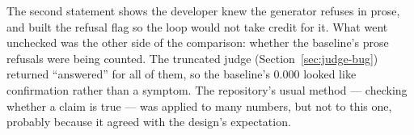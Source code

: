 \begin{inferred}
The second statement shows the developer knew the generator refuses in prose, and built the refusal flag so the loop would not take credit for it. What went unchecked was the other side of the comparison: whether the baseline's prose refusals were being counted. The truncated judge (Section~\ref{sec:judge-bug}) returned \enquote{answered} for all of them, so the baseline's 0.000 looked like confirmation rather than a symptom. The repository's usual method --- checking whether a claim is true --- was applied to many numbers, but not to this one, probably because it agreed with the design's expectation.
\end{inferred}
